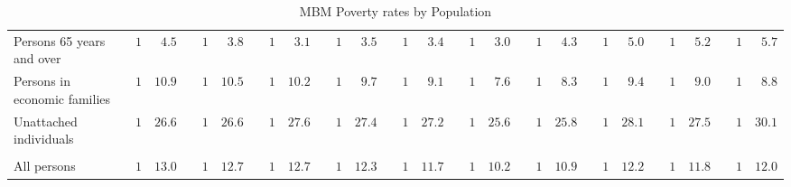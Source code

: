 \documentclass{article}\usepackage[]{graphicx}\usepackage[]{color}
\begin{document}
\begin{table}[!tbp]
\begin{center}
\begin{tabular}{lrrcrrcrrcrrcrrcrrcrrcrrcrrcrr}
Persons 65 years and over&$1$&$ 4.5$&&$1$&$ 3.8$&&$1$&$ 3.1$&&$1$&$ 3.5$&&$1$&$ 3.4$&&$1$&$ 3.0$&&$1$&$ 4.3$&&$1$&$ 5.0$&&$1$&$ 5.2$&&$1$&$ 5.7$\tabularnewline
Persons in economic families&$1$&$10.9$&&$1$&$10.5$&&$1$&$10.2$&&$1$&$ 9.7$&&$1$&$ 9.1$&&$1$&$ 7.6$&&$1$&$ 8.3$&&$1$&$ 9.4$&&$1$&$ 9.0$&&$1$&$ 8.8$\tabularnewline
Unattached individuals&$1$&$26.6$&&$1$&$26.6$&&$1$&$27.6$&&$1$&$27.4$&&$1$&$27.2$&&$1$&$25.6$&&$1$&$25.8$&&$1$&$28.1$&&$1$&$27.5$&&$1$&$30.1$\tabularnewline
\hline
&&&&&&&&&&&&&&&&&&&&&&&&&&&&&\tabularnewline
All persons&$1$&$13.0$&&$1$&$12.7$&&$1$&$12.7$&&$1$&$12.3$&&$1$&$11.7$&&$1$&$10.2$&&$1$&$10.9$&&$1$&$12.2$&&$1$&$11.8$&&$1$&$12.0$\tabularnewline
\hline
\end{tabular}
\end{center}
\caption{MBM Poverty rates by Population\label{tab1c}} 
\end{table}
\end{document}
